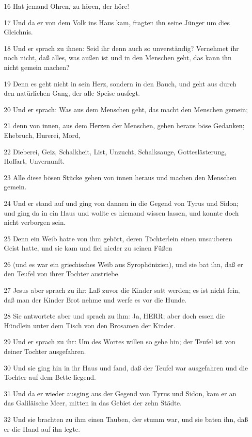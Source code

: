 \par 16 Hat jemand Ohren, zu hören, der höre!
\par 17 Und da er von dem Volk ins Haus kam, fragten ihn seine Jünger um dies Gleichnis.
\par 18 Und er sprach zu ihnen: Seid ihr denn auch so unverständig? Vernehmet ihr noch nicht, daß alles, was außen ist und in den Menschen geht, das kann ihn nicht gemein machen?
\par 19 Denn es geht nicht in sein Herz, sondern in den Bauch, und geht aus durch den natürlichen Gang, der alle Speise ausfegt.
\par 20 Und er sprach: Was aus dem Menschen geht, das macht den Menschen gemein;
\par 21 denn von innen, aus dem Herzen der Menschen, gehen heraus böse Gedanken; Ehebruch, Hurerei, Mord,
\par 22 Dieberei, Geiz, Schalkheit, List, Unzucht, Schalksauge, Gotteslästerung, Hoffart, Unvernunft.
\par 23 Alle diese bösen Stücke gehen von innen heraus und machen den Menschen gemein.
\par 24 Und er stand auf und ging von dannen in die Gegend von Tyrus und Sidon; und ging da in ein Haus und wollte es niemand wissen lassen, und konnte doch nicht verborgen sein.
\par 25 Denn ein Weib hatte von ihm gehört, deren Töchterlein einen unsauberen Geist hatte, und sie kam und fiel nieder zu seinen Füßen
\par 26 (und es war ein griechisches Weib aus Syrophönizien), und sie bat ihn, daß er den Teufel von ihrer Tochter austriebe.
\par 27 Jesus aber sprach zu ihr: Laß zuvor die Kinder satt werden; es ist nicht fein, daß man der Kinder Brot nehme und werfe es vor die Hunde.
\par 28 Sie antwortete aber und sprach zu ihm: Ja, HERR; aber doch essen die Hündlein unter dem Tisch von den Brosamen der Kinder.
\par 29 Und er sprach zu ihr: Um des Wortes willen so gehe hin; der Teufel ist von deiner Tochter ausgefahren.
\par 30 Und sie ging hin in ihr Haus und fand, daß der Teufel war ausgefahren und die Tochter auf dem Bette liegend.
\par 31 Und da er wieder ausging aus der Gegend von Tyrus und Sidon, kam er an das Galiläische Meer, mitten in das Gebiet der zehn Städte.
\par 32 Und sie brachten zu ihm einen Tauben, der stumm war, und sie baten ihn, daß er die Hand auf ihn legte.

